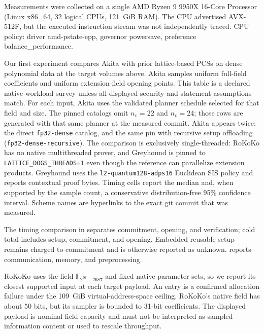 Measurements were collected on a single AMD Ryzen 9 9950X 16-Core Processor (Linux x86\_64, 32 logical CPUs, 121~GiB RAM). The CPU advertised AVX-512F, but the executed instruction stream was not independently traced. CPU policy: driver amd-pstate-epp, governor powersave, preference balance\_performance.

Our first experiment compares Akita with prior lattice-based PCSs on dense
polynomial data at the target volumes above. Akita samples uniform full-field
coefficients and uniform extension-field opening points. This table is a declared
native-workload survey unless all displayed security and statement assumptions match.
For each input, Akita
uses the validated planner schedule selected for that field and size.
The pinned catalogs omit $n_v=22$ and $n_v=24$; those rows are generated
with that same planner at the measured commit.
Akita appears twice: the direct \texttt{fp32-dense} catalog, and the same pin
with recursive setup offloading (\texttt{fp32-dense-recursive}).
The comparison is exclusively single-threaded: RoKoKo has no native multithreaded
prover, and Greyhound is pinned to \texttt{LATTICE\_DOGS\_THREADS=1} even though the
reference can parallelize extension products. Greyhound uses the
\texttt{l2-quantum128-adps16} Euclidean SIS policy and reports contextual proof bytes.
Timing cells report the median and, when supported by the sample count, a
conservative distribution-free 95\% confidence interval. Scheme names are hyperlinks to the exact git commit that was measured.

The timing comparison in  separates commitment,
opening, and verification; cold total includes setup, commitment, and opening.
Embedded reusable setup remains charged to commitment and is otherwise reported as unknown.
 reports communication, memory, and preprocessing.

RoKoKo uses the field $\mathbb F_{2^{50}-2687}$ and fixed native parameter
sets, so we report its closest supported input at each target payload.  An
\evaloom{} entry is a confirmed allocation failure under the 109~GiB virtual-address-space ceiling.
RoKoKo's native field has about $50$ bits, but its sampler is bounded to
31-bit coefficients. The displayed payload is nominal field capacity and must not
be interpreted as sampled information content or used to rescale throughput.

